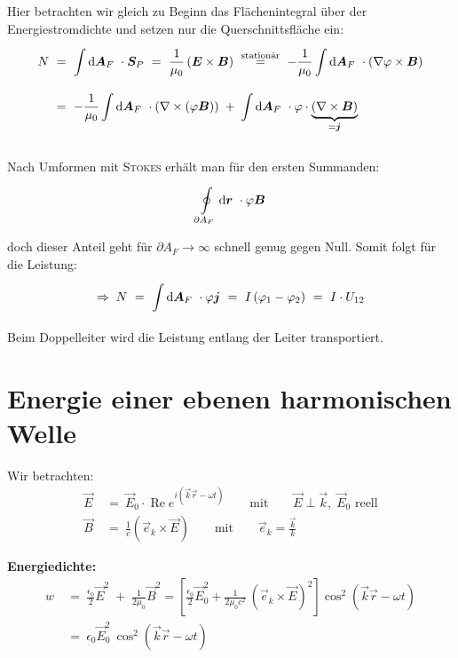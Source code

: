 \begin{enumerate}
Hier betrachten wir gleich zu Beginn das Flächenintegral über der Energiestromdichte und setzen nur die Querschnittsfläche ein:
\\[-.5cm]
\begin{align*}
N \ &= \ \int\limits_{{}}^{{}}\mathrm{d}{\bm{A}_F}\  \cdot \bm{S}_P \ = \ \frac{1}{\mu_0} \left(\bm{E}\times\bm{B}\right) \ \overset{\text{stationär}}{=} \ - \frac{1}{\mu_0} \int\limits_{{}}^{{}}\mathrm{d}{\bm{A}_F}\  \cdot \left(\nabla \varphi \times \bm{B}\right)\\
&= \ - \frac{1}{\mu_0} \int\limits_{{}}^{{}}\mathrm{d}{\bm{A}_F}\  \cdot \left(\nabla\times\left(\varphi\bm{B}\right)\right) \; + \; \int\limits_{{}}^{{}}\mathrm{d}{\bm{A}_F}\ \cdot\varphi\cdot\underbrace{\left(\nabla\times\bm{B}\right)}_{=\bm{j}}
\end{align*}
\\[-.3cm]
Nach Umformen mit \textsc{Stokes} erhält man für den ersten Summanden:
\\[-.3cm]
\begin{equation*}
\oint\limits_{{\partial A_F}}^{{}}\mathrm{d}{\bm{r}}\   \cdot \varphi \bm{B}
\end{equation*}

doch dieser Anteil geht für $\partial A_F \rightarrow \infty$ schnell genug gegen Null. Somit folgt für die Leistung:
\\[-.3cm]
\begin{equation*}
\Rightarrow \; N \ = \ \Int{}{}{\vec{A}_F} \cdot \varphi \vec{j} \ = \ I \left(\varphi_1 - \varphi_2 \right) \ = \ I \cdot U_{12}
\end{equation*}
Beim Doppelleiter wird die Leistung entlang der Leiter transportiert.
\end{enumerate}


\section{Energie einer ebenen harmonischen Welle}

Wir betrachten:
\begin{align*}
\vec{E} \ &= \ \vec{E}_0 \cdot \operatorname{Re} e^{i\left(\vec{k}\vec{r}-\omega t\right)} \qquad \text{mit} \qquad \vec{E}\perp\vec{k}, \; \vec{E}_0 \text{ reell}\\
\vec{B} \ &= \ \frac{1}{c}\left(\vec{e}_k\times\vec{E}\right) \qquad \text{mit} \qquad \vec{e}_k = \frac{\vec{k}}{k}
\end{align*}

\textbf{Energiedichte:}
\begin{align*}
w \ &= \ \frac{\epsilon_0}{2} \vec{E}^2 \; + \; \frac{1}{2\mu_0}\vec{B}^2 = \left[\frac{\epsilon_0}{2}\vec{E}_0^2 + \frac{1}{2\mu_0 c^2} \ \left(\vec{e}_k\times\vec{E}\right)^2\right] \cos^2\left(\vec{k}\vec{r}-\omega t\right)\\
&= \ \epsilon_0 \vec{E}_0^2 \ \cos^2\left(\vec{k}\vec{r}-\omega t\right)
\end{align*}


